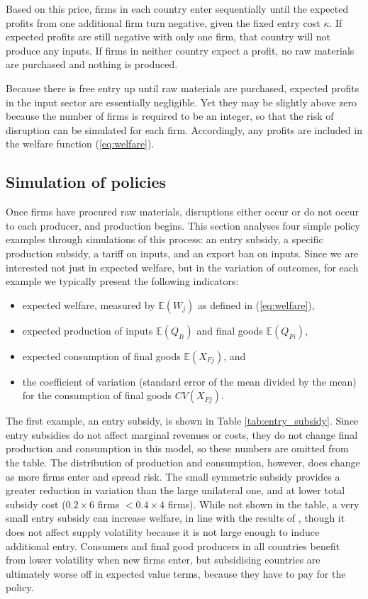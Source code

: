 \documentclass{article}
\begin{document}
Based on this price, firms in each country enter sequentially until the expected profits from one additional firm turn negative, given the fixed entry cost $\kappa$. If expected profits are still negative with only one firm, that country will not produce any inputs. If firms in neither country expect a profit, no raw materials are purchased and nothing is produced.

Because there is free entry up until raw materials are purchased, expected profits in the input sector are essentially negligible. Yet they may be slightly above zero because the number of firms is required to be an integer, so that the risk of disruption can be simulated for each firm. Accordingly, any profits are included in the welfare function (\ref{eq:welfare}).

\subsection{Simulation of policies}

Once firms have procured raw materials, disruptions either occur or do not occur to each producer, and production begins. This section analyses four simple policy examples through simulations of this process: an entry subsidy, a specific production subsidy, a tariff on inputs, and an export ban on inputs. Since we are interested not just in expected welfare, but in the variation of outcomes, for each example we typically present the following indicators:
\begin{itemize}
    \item expected welfare, measured by $\mathbb{E} (W_{j})$ as defined in (\ref{eq:welfare}), 
    \item expected production of inputs $\mathbb{E} (Q_{Ii})$ and final goods $\mathbb{E} (Q_{Fi})$, 
    \item expected consumption of final goods $\mathbb{E} (X_{Fj})$, and
    \item the coefficient of variation (standard error of the mean divided by the mean) for the consumption of final goods $CV (X_{Fj})$.
\end{itemize}

The first example, an entry subsidy, is shown in Table \ref{tab:entry_subsidy}. Since entry subsidies do not affect marginal revenues or costs, they do not change final production and consumption in this model, so these numbers are omitted from the table. The distribution of production and consumption, however, does change as more firms enter and spread risk. The small symmetric subsidy provides a greater reduction in variation than the large unilateral one, and at lower total subsidy cost ($0.2 \times 6$ firms $< 0.4 \times 4$ firms). While not shown in the table, a very small entry subsidy can increase welfare, in line with the results of \textcite{bagwell_trade_2018}, though it does not affect supply volatility because it is not large enough to induce additional entry. Consumers and final good producers in all countries benefit from lower volatility when new firms enter, but subsidising countries are ultimately worse off in expected value terms, because they have to pay for the policy.
\end{document}
